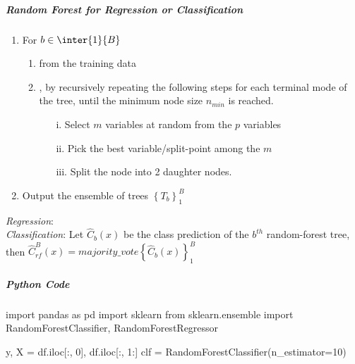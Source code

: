 \subparagraph{Random Forest for Regression or Classification}
\begin{enumerate}
	\item For $b\in\inter{1}{B}$
		\begin{enumerate}[label=(\alph*)]
			\item {} from the training
				data
			\item {}, by
				recursively repeating the following steps for each terminal mode
				of the tree, until the minimum node size $n_{min}$ is reached.
				\begin{enumerate}[label=\alph*]
					\item[i.] Select $m$ variables at random from the $p$ 
						variables
					\item[ii.] Pick the best variable/split-point among the $m$
					\item[iii.] Split the node into 2 daughter nodes.
				\end{enumerate}
		\end{enumerate}
	\item Output the ensemble of trees $\left\{T_{b}\right\}_{1}^{B}$
\end{enumerate}
\textit{Regression}: \\
\textit{Classification}: Let $\hat{C}_{b}(x)$ be the class prediction of the $b^{th}$ 
random-forest tree, then $\hat{C}_{rf}^{B}(x)=majority\_vote\left\{\hat{C}_{b}(x)\right\}_{1}^{B}$

\subparagraph{Python Code}
\begin{python}
import pandas as pd
import sklearn
from sklearn.ensemble import RandomForestClassifier,
    RandomForestRegressor

y, X = df.iloc[:, 0], df.iloc[:, 1:]
clf = RandomForestClassifier(n_estimator=10)
\end{python}

